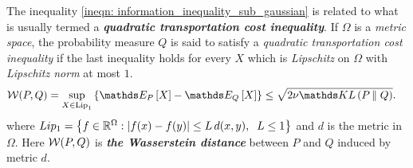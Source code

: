 \documentclass[11pt]{article}
\begin{document}
\begin{itemize}
\begin{remark}
The inequality  \eqref{ineqn: information_inequality_sub_gaussian} is related to what is usually termed a \emph{\textbf{quadratic transportation cost inequality}}. If $\Omega$ is a \emph{metric space}, the probability measure $Q$ is said to satisfy a \emph{quadratic transportation cost inequality} if the last inequality holds for every $X$ which is \emph{Lipschitz} on $\Omega$ with \emph{Lipschitz norm} at most $1$. 
\begin{align}
\cW(P, Q) = \sup_{X \in \text{Lip}_1}\set{\E{P}{X} - \E{Q}{X} } &\le \sqrt{2\nu\kl{P}{Q}}. \label{ineqn: information_inequality_sub_gaussian_wasserstein}
\end{align} where $Lip_1 = \left\{f \in {\mathbb R}^{\Omega}: \left\lvert f(x) - f(y) \right\rvert \le L\,d(x, y), \;\; L\le 1\right\}$ and $d$ is the metric in $\Omega$. Here ${\mathcal W}(P,Q)$ is \emph{\textbf{the Wasserstein distance}} between $P$ and $Q$ induced by metric $d$.
\end{remark}
\end{itemize}
\end{document}
